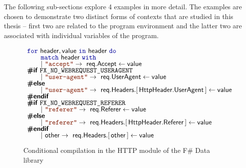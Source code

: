 The following sub-sections explore 4 examples in more detail. The examples are chosen to
demonstrate two distinct forms of contexts that are studied in this thesis -- first two are
related to the program environment and the latter two are associated with individual variables of 
the program.


\begin{figure}
\begin{equation*}
\begin{array}{l}
\kvd{for}~\ident{header},\ident{value}~\kvd{in}~\ident{header}~\kvd{do}\\[-0.25em]
\hspace{2em}\kvd{match}~\ident{header}~\kvd{with}\\[-0.25em]
\hspace{2em}|~\str{accept} \rightarrow~ \ident{req.Accept} \leftarrow \ident{value}\\[-0.25em]
%
\prepk{\#if}~\prepi{FX\_NO\_WEBREQUEST\_USERAGENT}\\[-0.25em]
\hspace{2em}|~\str{user-agent} \rightarrow~ \ident{req.UserAgent} \leftarrow \ident{value}\\[-0.25em]
\prepk{\#else}\\[-0.25em]
\hspace{2em}|~\str{user-agent} \rightarrow~
  \ident{req.Headers}.[\,\ident{HttpHeader.UserAgent}\,] \leftarrow \ident{value}\\[-0.25em]
\prepk{\#endif}\\[-0.25em]
%
\prepk{\#if}~\prepi{FX\_NO\_WEBREQUEST\_REFERER}\\[-0.25em]
\hspace{2em}|~\str{referer} \rightarrow~ \ident{req.Referer} \leftarrow \ident{value}\\[-0.25em]
\prepk{\#else}\\[-0.25em]
\hspace{2em}|~\str{referer} \rightarrow~
  \ident{req.Headers}.[\,\ident{HttpHeader.Referer}\,] \leftarrow \ident{value}\\[-0.25em]
\prepk{\#endif}\\[-0.25em]
%
\hspace{2em}|~\ident{other} \rightarrow~ \ident{req.Headers}.[\,\ident{other}\,] \leftarrow \ident{value}\\[-0.25em]
\end{array}
\end{equation*}

\caption{Conditional compilation in the HTTP module of the F\# Data library}
\label{fig:introduction-context-http}
\end{figure}

